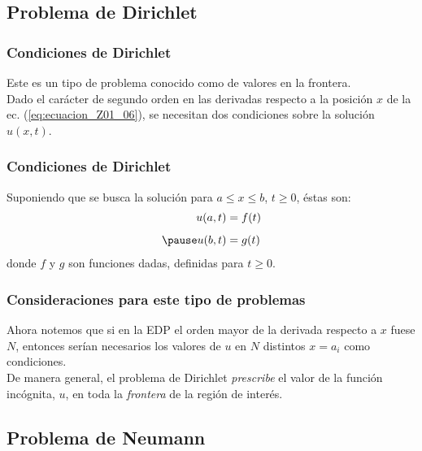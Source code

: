 \documentclass[12pt]{beamer}
\begin{document}
\subsection{Problema de Dirichlet}

\begin{frame}
\frametitle{Condiciones de Dirichlet}
Este es un tipo de problema conocido como de valores en la frontera.
\\
\bigskip
\pause
Dado el carácter de segundo orden en las derivadas respecto a la posición $x$ de la ec. (\ref{eq:ecuacion_Z01_06}), se necesitan dos condiciones sobre la solución $u(x, t)$.
\end{frame}
\begin{frame}
\frametitle{Condiciones de Dirichlet}
Suponiendo que se busca la solución para $a  \leq x \leq b$, $t \geq 0$, éstas son:
\pause
\begin{eqnarray}
u(a, t) &= f (t) \label{eq:ecuacion_Z01_09} \\[0.5em] \pause
u(b, t) &= g(t) \label{eq:ecuacion_Z01_10}
\end{eqnarray}
donde $f$ y $g$ son funciones dadas, definidas para $t \geq 0$.
\end{frame}
\begin{frame}
\frametitle{Consideraciones para este tipo de problemas}
Ahora notemos que si en la EDP el orden mayor de la derivada respecto a $x$ fuese $N$, entonces serían necesarios los valores de $u$ en $N$ distintos $x = a_{i}$ como condiciones. 
\\
\bigskip
\pause
De manera general, el problema de Dirichlet \emph{prescribe} el valor de la función incógnita, $u$, en toda la \emph{frontera} de la región de interés.
\end{frame}

\subsection{Problema de Neumann}
\end{document}
